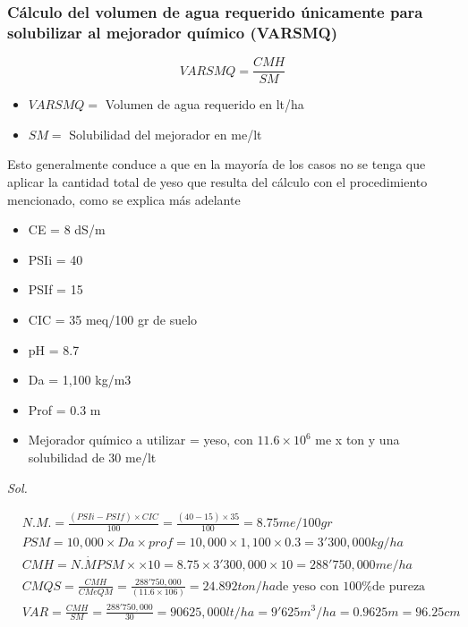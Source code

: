 \subsubsection{Cálculo del volumen de agua requerido únicamente para solubilizar al mejorador químico (VARSMQ)}
\begin{equation}
    VARSMQ = \frac{CMH}{SM}
\end{equation}
\begin{notation}
    \begin{itemize}
        \item $VARSMQ =$ Volumen de agua requerido en lt/ha
        \item $SM =$ Solubilidad del mejorador en me/lt
    \end{itemize}
\end{notation}
Esto generalmente conduce a que en la mayoría de los casos no se tenga que aplicar la cantidad total de yeso que resulta del cálculo con el procedimiento mencionado, como se explica más adelante
\begin{example}
    \begin{itemize}
        \item CE = 8 dS/m
        \item PSIi = 40
        \item PSIf = 15
        \item CIC = 35 meq/100 gr de suelo
        \item pH = 8.7
        \item Da = 1,100 kg/m3
        \item Prof = 0.3 m
        \item Mejorador químico a utilizar = yeso, con $11.6 \times 10^6$ me x ton y una solubilidad de 30 me/lt
    \end{itemize}
\end{example}
\textit{ Sol. }

\begin{align*}
    &N.M. = \frac{(PSIi - PSIf) \times  CIC}{100} = \frac{(40 - 15) \times  35}{100} = 8.75 me/100 gr\\
    &PSM = 10,000 \times  Da \times  prof = 10,000 \times  1,100 \times  0.3 = 3'300,000 kg/ha\\
    &CMH = N.\dot{M} PSM \times  \times  10 = 8.75 \times  3'300,000 \times  10 = 288'750,000 me/ha\\
    &CMQS = \frac{CMH}{CMeQM} = \frac{288'750,000}{(11.6 \times  106 )}= 24.892 ton/ha \text{de yeso con 100\% de pureza}\\
    &VAR = \frac{CMH}{SM} = \frac{288'750,000}{30} = 90625,000 lt/ha =9'625 m^3 /ha = 0.9625 m = 96.25 cm
\end{align*}

